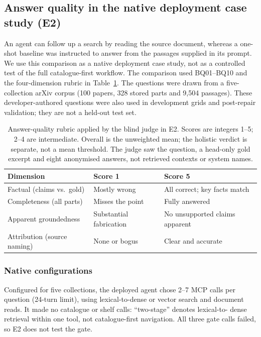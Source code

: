 \subsection{Answer quality in the native deployment case study (E2)}
\label{sec:e10}
\label{sec:external-baselines}
\label{sec:exp-e2}
An agent can follow up a search by reading the source document, whereas a
one-shot baseline was instructed to answer from the passages supplied in its
prompt. We use this comparison as a native deployment case study, not as a
controlled test of the full catalogue-first workflow. The comparison used BQ01--BQ10 and the
four-dimension rubric in Table~\ref{tab:rubric}. The questions were
drawn from a five-collection
arXiv corpus (100 papers, 328 stored parts and 9{,}504 passages). These
developer-authored questions were also used in development grids and
post-repair validation; they are not a held-out test set.

\begin{table}[!tb]
\centering
\scriptsize
\setlength{\tabcolsep}{2.5pt}
\renewcommand{\arraystretch}{1.03}
\caption{Answer-quality rubric applied by the blind judge in E2. Scores are
integers 1--5; 2--4 are intermediate. Overall is the unweighted mean; the
holistic verdict is separate, not a mean threshold. The judge saw the
question, a head-only gold excerpt and eight anonymised answers, not
retrieved contexts or system names.}
\label{tab:rubric}
\begin{tabular}{@{}>{\raggedright\arraybackslash}p{}>{\raggedright\arraybackslash}p{}>{\raggedright\arraybackslash}p{}@{}}
\toprule
Dimension & Score 1 & Score 5\\
\midrule
Factual (claims vs.\ gold) & Mostly wrong & All correct; key facts match\\
Completeness (all parts) & Misses the point & Fully answered\\
Apparent groundedness & Substantial fabrication & No unsupported claims apparent\\
Attribution (source naming) & None or bogus & Clear and accurate\\
\bottomrule
\end{tabular}
\end{table}

\subsubsection{Native configurations}
Configured for five collections, the deployed agent chose 2--7 MCP calls per
question (24-turn limit), using lexical-to-dense or vector search and document
reads. It made no catalogue or shelf calls: ``two-stage'' denotes lexical-to-
dense retrieval within one tool, not catalogue-first navigation. All three
gate calls failed, so E2 does not test the gate.

